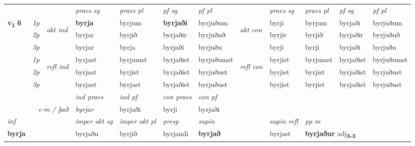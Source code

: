 \begin{longtable}[l]{X>{\footnotesize\itshape}llXXXXlXXXX}
\midrule

 & &   & \textit{praes sg}  & \textit{praes pl}    & \textit{ pf sg} & \textit{pf pl} & & \textit{praes sg}  & \textit{praes pl}    & \textit{pf sg} & \textit{pf pl }  \\ \cmidrule{4-7} \cmidrule{9-12}
 \multirow{2}{*}{{{\textbf{v{\textsubscript{1}}} \Large{\textbf{6}}}}}  & 1p & \multirow{3}{*}{\begin{turn}{90}\textit{akt ind}\end{turn}} & \textbf{byrja} & byrjum & \textbf{byrjaði} & byrjuðum & \multirow{3}{*}{\begin{turn}{90}\textit{akt con}\end{turn}} &byrji & byrjum & byrjaði & byrjuðum\\*
 & 2p &  &  byrjar  & byrjið & byrjaðir & byrjuðuð & & byrjir & byrjið & byrjaðir & byrjuðuð \\*
 & 3p &  & byrjar & byrja & byrjaði & byrjuðu & & byrji & byrji& byrjaði & byrjuðu \\*
\cmidrule{4-7} \cmidrule{9-12}
 & 1p & \multirow{3}{*}{\begin{turn}{90}\textit{refl ind}\end{turn}}  & byrjast & byrjumst & byrjaðist & byrjuðumst & \multirow{3}{*}{\begin{turn}{90}\textit{refl con}\end{turn}}  &byrjist & byrjumst & byrjaðist & byrjuðumst \\*
 & 2p &  & byrjast & byrjist & byrjaðist & byrjuðust & &byrjist & byrjist & byrjaðist & byrjuðust \\*
 & 3p  & & byrjast & byrjast & byrjaðist & byrjuðust & & byrjist & byrjist& byrjaðist & byrjuðust \\*
\cmidrule{4-7} \cmidrule{9-12}

   && &  \textit{ind praes} & \textit{ind pf} & \textit{con praes} & \textit{con pf} \\*
\multicolumn{3}{r}{\textit{e-m / það}} & byrjar & byrjaði & byrji & byrjaði \\*

\cmidrule{4-7}
   {\textit{inf}} & &  & \textit{imper akt sg} & \textit{imper akt pl}   & \textit{presp} & \textit{supin} && \textit{supin refl} & \textit{pp m} \\*
  {\textbf{byrja}} & && byrjaðu  & byrjið   & byrjandi &  \textbf{byrjað} && byrjast & \multicolumn{2}{l}{\textbf{byrjaður} adj\textbf{\textsubscript{3-3}}} \\*


\end{longtable}

